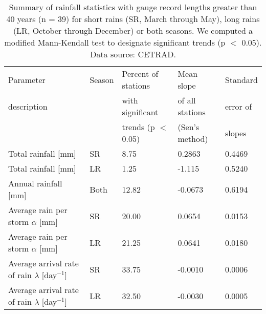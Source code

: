 \begin{table}
\caption{Summary of rainfall statistics with gauge record lengths greater than 40 years (n = 39) for short rains (SR, March through May), long rains (LR, October through December) or both seasons. We computed a modified Mann-Kendall test to designate significant trends (p $<$ 0.05). Data source: CETRAD.}
\centering
\begin{tabular}{llll l}
\\\hline
Parameter  & Season & Percent of stations  & Mean slope   & Standard  \\
description  & & with significant   & of all stations & error of \\ 
& & trends (p $<$ 0.05) & (Sen's method) & slopes \\
\hline
  Total rainfall [mm] & SR & 8.75 & 0.2863 & 0.4469 \\
   Total rainfall [mm] & LR & 1.25 & -1.115 & 0.5240 \\
   Annual rainfall [mm] & Both & 12.82 & -0.0673 & 0.6194 \\
   Average rain per storm  $\alpha$ [mm] & SR & 20.00 & 0.0654 & 0.0153 \\
  Average rain per storm  $\alpha$ [mm] & LR & 21.25 & 0.0641 & 0.0180 \\
   Average arrival rate of rain  $\lambda$ [day$^{-1}$]  & SR & 33.75 & -0.0010 & 0.0006 \\
   Average arrival rate of rain $\lambda$ [day$^{-1}$]  & LR & 32.50 & -0.0030 & 0.0005 
\\\hline
\end{tabular}
\label{table:mk}
\end{table}